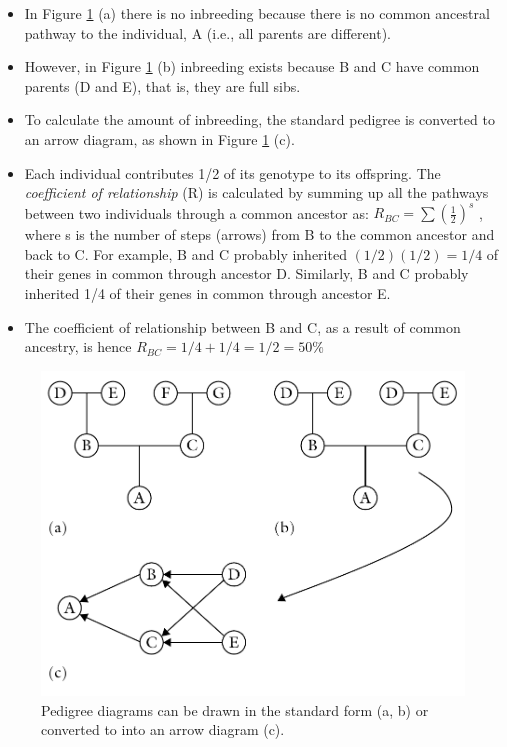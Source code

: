 \documentclass[11pt,ignorenonframetext,aspectratio=169]{beamer}
\providecommand{\tightlist}{%
  \setlength{\itemsep}{0pt}\setlength{\parskip}{0pt}}
\begin{document}
\begin{frame}{}
\protect\hypertarget{section-3}{}
\begin{itemize}
\tightlist
\item
  In Figure \ref{fig:inbreeding-coefficient} (a) there is no inbreeding
  because there is no common ancestral pathway to the individual, A
  (i.e., all parents are different).
\item
  However, in Figure \ref{fig:inbreeding-coefficient} (b) inbreeding
  exists because B and C have common parents (D and E), that is, they
  are full sibs.
\item
  To calculate the amount of inbreeding, the standard pedigree is
  converted to an arrow diagram, as shown in Figure
  \ref{fig:inbreeding-coefficient} (c).
\item
  Each individual contributes 1/2 of its genotype to its offspring. The
  \emph{coefficient of relationship} (R) is calculated by summing up all
  the pathways between two individuals through a common ancestor as:
  \(R_{BC} = \sum{\left(\frac{1}{2}\right)^s}\) , where s is the number
  of steps (arrows) from B to the common ancestor and back to C. For
  example, B and C probably inherited \((1/2)(1/2) = 1/4\) of their
  genes in common through ancestor D. Similarly, B and C probably
  inherited 1/4 of their genes in common through ancestor E.
\item
  The coefficient of relationship between B and C, as a result of common
  ancestry, is hence \(R_{BC} = 1/4 + 1/4 = 1/2 = 50\%\)
\end{itemize}
\end{frame}

\begin{frame}{}
\protect\hypertarget{section-4}{}
\begin{figure}

{\centering \includegraphics[width=0.6\linewidth]{./images/arrow_diagram} 

}

\caption{Pedigree diagrams can be drawn in the standard form (a, b) or converted to into an arrow diagram (c).}\label{fig:inbreeding-coefficient}
\end{figure}
\end{frame}
\end{document}
